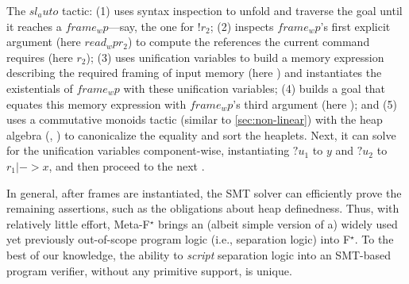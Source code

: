 \documentclass[runningheads]{llncs}
\newcommand\fstar{F$^\star$\xspace}
\newcommand\metafstar{Meta-F$^\star$\xspace}
\newcommand{\comm}[3]{\ifcheckpagebudget\else\ifdraft{{\color{#1}[#2: #3]}}\fi\fi}
\newcommand{\da}[1]{\comm{dkyellow}{Danel}{#1}}
\begin{document}

The \ls$sl_auto$ tactic:
(1) uses syntax inspection to unfold and traverse the goal
until it reaches a \ls$frame_wp$---say, the one for \ls$!r_2$;
(2) inspects \ls$frame_wp$'s first explicit argument (here \ls$read_wp r_2$) to
compute the references the current command requires (here \ls$r_2$);
(3) uses unification variables to build a memory expression describing the
required framing of input memory
(here )
and instantiates the existentials of \ls$frame_wp$ with these unification variables;
(4) builds a goal that equates this memory expression with \ls$frame_wp$'s
third argument (here );
and (5) uses a commutative monoids tactic
(similar to \autoref{sec:non-linear})
with the heap algebra
(, \ls{$\bullet$}) to canonicalize the equality
and sort the heaplets.
%
Next, it can solve for the unification variables component-wise,
instantiating \ls$?u_1$ to \ls$y$ and \ls$?u_2$ to \ls$r_1 |-> x$, 
and then proceed to the next .
%


In general, after frames are instantiated, the SMT solver can
efficiently prove the remaining assertions, such as the obligations
about heap definedness.
%
Thus, with relatively little effort, \metafstar brings an
(albeit simple version of a) widely used
yet previously out-of-scope program logic (i.e., separation logic) into \fstar.
%
To the best of our knowledge, the ability to \emph{script} separation
logic into an SMT-based program verifier, without any primitive
support, is unique.
\end{document}
